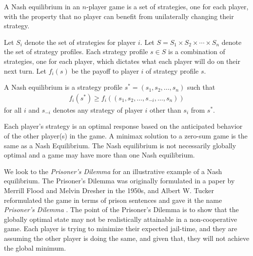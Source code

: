 \begin{definition}
  A \textnormal{\sffamily Nash equilibrium} in an $n$-player game is a
  set of strategies, one for each player, with the property that no
  player can benefit from unilaterally changing their strategy.

  Let $S_i$ denote the set of strategies for player $i$. Let
  $S = S_1 \times S_2 \times \cdots \times S_n$ denote the set of
  strategy profiles.  Each strategy profile $s \in S$ is a combination
  of strategies, one for each player, which dictates what each player
  will do on their next turn.  Let $f_i(s)$ be the payoff to player
  $i$ of strategy profile $s$.

  A Nash equilibrium is a strategy profile
  $s^* = (s_1, s_2, \dots, s_n)$ such that
  \begin{align}
  f_i(s^*) \geq f_i((s_1, s_2, \dots, s_{-i}, \dots, s_n))
  \end{align}
  for all $i$ and $s_{-i}$ denotes any strategy of player $i$ other
  than $s_i$ from $s^*$.
\end{definition}

\begin{remark}
  Each player's strategy is an optimal response based on the
  anticipated behavior of the other player(s) in the game.  A minimax
  solution to a zero-sum game is the same as a Nash Equilibrium. The
  Nash equilibrium is not necessarily globally optimal and a game may
  have more than one Nash equilibrium.
\end{remark}


We look to the \textit{Prisoner's Dilemma} for an illustrative example
of a Nash equilibrium. The Prisoner's Dilemma was originally
formulated in a paper by Merrill Flood and Melvin Dresher in the
1950s, and Albert W. Tucker reformulated the game in terms of prison
sentences and gave it the name \textit{Prisoner's Dilemma}
\cite{ref:poundstone}. The point of the Prisoner's Dilemma is to show
that the globally optimal state may not be realistically attainable in
a non-cooperative game. Each player is trying to minimize their
expected jail-time, and they are assuming the other player is doing
the same, and given that, they will not achieve the global minimum.

